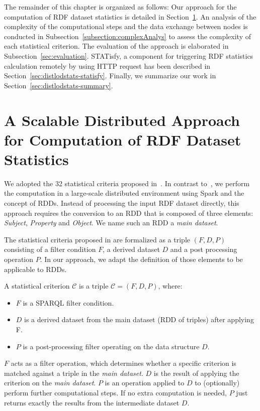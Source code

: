 The remainder of this chapter is organized as follows: 
Our approach for the computation of \gls{RDF} dataset statistics is detailed in Section~\ref{sec:approach}.
An analysis of the complexity of the computational steps and the data exchange between nodes is conducted in Subsection~\ref{subsection:complexAnalys} to assess the complexity of each statistical criterion.
The evaluation of the approach is elaborated in Subsection~\ref{sec:evaluation}.
STATisfy, a component for triggering \gls{RDF} statistics calculation remotely by using HTTP request has been described in Section~\ref{sec:distlodstats-statisfy}.
Finally, we summarize our work in Section~\ref{sec:distlodstats-summary}.

\section{A Scalable Distributed Approach for Computation of RDF Dataset Statistics}
\label{sec:approach}
We adopted the 32 statistical criteria proposed in~\cite{demter-2012-ekaw}.
In contrast to~\cite{demter-2012-ekaw}, we perform the computation in a large-scale distributed environment using Spark and the concept of \gls{RDD}s.
Instead of processing the input \gls{RDF} dataset directly, this approach requires the conversion to an \gls{RDD} that is composed of three elements: \emph{Subject}, \emph{Property} and \emph{Object}.
We name such an \gls{RDD} a \emph{main dataset}.

The statistical criteria proposed in \cite{demter-2012-ekaw} are formalized as a triple $(F,D,P)$ consisting of a filter condition $F$, a derived dataset $D$ and a post processing operation $P$. 
In our approach, we adapt the definition of those elements to be applicable to \gls{RDD}s.

\begin{definition}
\label{def:statcriteria}
A statistical criterion $\mathcal{C}$ is a triple $\mathcal{C} = (F, D, P)$, where:
  
 \begin{itemize}
 \item $F$ is a \gls{SPARQL} filter condition. 
 \item $D$ is a derived dataset from the main dataset (\gls{RDD} of triples) after applying F.
 \item $P$ is a post-processing filter operating on the data structure $D$.
\end{itemize}
\end{definition}
\noindent
$F$ acts as a filter operation, which determines whether a specific criterion is matched against a triple in the \emph{main dataset}.
$D$ is the result of applying the criterion on the \emph{main dataset}.
$P$ is an operation applied to $D$ to (optionally) perform further computational steps.
If no extra computation is needed, $P$ just returns exactly the results from the intermediate dataset $D$.


